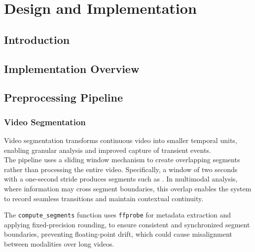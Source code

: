 \documentclass[12pt,a4paper,oneside,english]{book}
\begin{document}
\chapter{Design and Implementation}
\label{chap:implementation}
\section*{Introduction}
\section{Implementation Overview}%

\section{Preprocessing Pipeline}%


\subsection{Video Segmentation} %

Video segmentation transforms continuous video into smaller temporal units, enabling granular analysis and improved capture of transient events.
\\The pipeline uses a sliding window mechanism to create overlapping segments rather than processing the entire video.
Specifically, a window of two seconds with a one-second stride produces segments such as . In multimodal analysis, where information may cross segment boundaries, this overlap enables the system to record seamless transitions and maintain contextual continuity.

The \texttt{compute\_segments} function uses \texttt{ffprobe} for metadata extraction and applying fixed-precision rounding, to ensure consistent and synchronized segment boundaries, preventing floating-point drift, which could cause misalignment between modalities over long videos.
\end{document}
